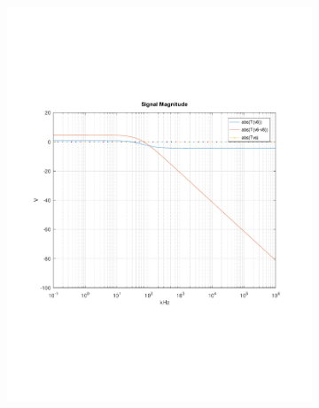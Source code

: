 \begin{figure}[h]
  \centering
  \begin{subfigure}{0.23\textwidth}
    \includegraphics[width=\linewidth, clip]{../mat/Transmagnitude.pdf}
    \label{fig:PStime}
  \end{subfigure}
  \begin{subfigure}{0.23\textwidth}

\end{subfigure}
\end{figure}
